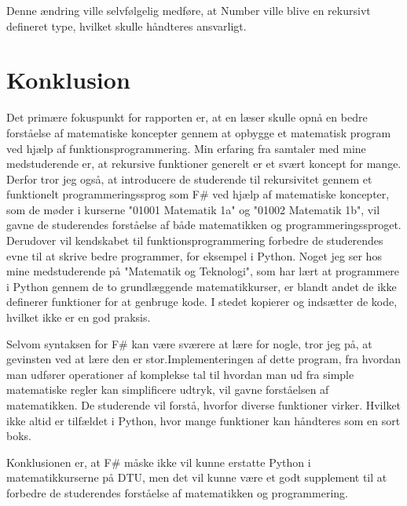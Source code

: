 \documentclass{article}
\begin{document}
Denne ændring ville selvfølgelig medføre, at Number ville blive en rekursivt defineret type, hvilket skulle håndteres ansvarligt.
\section{Konklusion}
Det primære fokuspunkt for rapporten er, at en læser skulle opnå en bedre forståelse af matematiske koncepter gennem at opbygge et matematisk program ved hjælp af funktionsprogrammering. Min erfaring fra samtaler med mine medstuderende er, at rekursive funktioner generelt er et svært koncept for mange. Derfor tror jeg også, at introducere de studerende til rekursivitet gennem et funktionelt programmeringssprog som F\# ved hjælp af matematiske koncepter, som de møder i kurserne "01001 Matematik 1a" og "01002 Matematik 1b", vil gavne de studerendes forståelse af både matematikken og programmeringssproget. Derudover vil kendskabet til funktionsprogrammering forbedre de studerendes evne til at skrive bedre programmer, for eksempel i Python. Noget jeg ser hos mine medstuderende på "Matematik og Teknologi", som har lært at programmere i Python gennem de to grundlæggende matematikkurser, er blandt andet de ikke definerer funktioner for at genbruge kode. I stedet kopierer og indsætter de kode, hvilket ikke er en god praksis.


Selvom syntaksen for F\# kan være sværere at lære for nogle, tror jeg på, at gevinsten ved at lære den er stor.Implementeringen af dette program, fra hvordan man udfører operationer af komplekse tal til hvordan man ud fra simple matematiske regler kan simplificere udtryk, vil gavne forståelsen af matematikken. De studerende vil forstå, hvorfor diverse funktioner virker. Hvilket ikke altid er tilfældet i Python, hvor mange funktioner kan håndteres som en sort boks.


Konklusionen er, at F\# måske ikke vil kunne erstatte Python i matematikkurserne på DTU, men det vil kunne være et godt supplement til at forbedre de studerendes forståelse af matematikken og programmering.


\newpage
\printbibliography

\newpage

\end{document}
